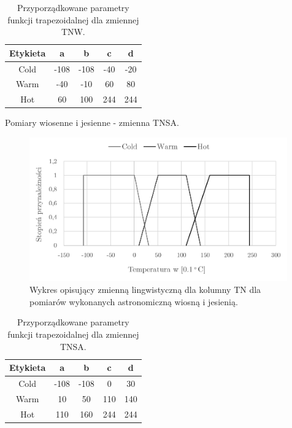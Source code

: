 \documentclass{classrep}
\begin{document}
\begin{table}[H]
	\centering
	\begin{tabular}{c c c c c} 
		\hline
		\textbf{Etykieta} & \textbf{a} & \textbf{b} & \textbf{c} & \textbf{d}\\ [0.5ex] 
		\hline
		\hline 
Cold	 &-108 & -108 & -40 & -20 \\
Warm & -40 & -10 & 60 & 80 \\
Hot	 & 60 & 100 & 244 & 244 \\
		\hline
	\end{tabular}
	\caption{Przyporządkowane parametry funkcji trapezoidalnej dla zmiennej TNW.}
\end{table}

Pomiary wiosenne i jesienne - zmienna TNSA.
\begin{figure}[H]
	\centering
	\includegraphics[width=0.99\textwidth]{Pictures/TermsCharts/TN_WJ.png}
	\caption{Wykres opisujący zmienną lingwistyczną dla kolumny TN dla pomiarów wykonanych astronomiczną wiosną i jesienią.}
\end{figure}

\begin{table}[H]
	\centering
	\begin{tabular}{c c c c c} 
		\hline
		\textbf{Etykieta} & \textbf{a} & \textbf{b} & \textbf{c} & \textbf{d}\\ [0.5ex] 
		\hline
		\hline 
Cold	 &-108 & -108 & 0 & 30 \\
Warm & 10 & 50 & 110 & 140 \\
Hot	 & 110 & 160 & 244 & 244 \\
		\hline
	\end{tabular}
	\caption{Przyporządkowane parametry funkcji trapezoidalnej dla zmiennej TNSA.}
\end{table}
\end{document}
